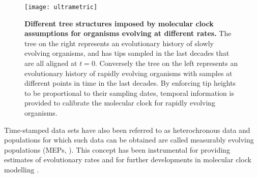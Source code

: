 


\begin{figure}[H]
\centering
\texttt{[image: ultrametric]} 
\caption{
{ \footnotesize 
{\bf Different tree structures imposed by molecular clock assumptions for organisms evolving at different rates.} 
The tree on the right represents an evolutionary history of slowly evolving organisms, and has tips sampled in the last decades that are all aligned at $t=0$. 
Conversely the tree on the left represents an evolutionary history of rapidly evolving organisms with samples at different points in time in the last decades. 
By enforcing tip heights to be proportional to their sampling dates, temporal information is provided to calibrate the molecular clock for rapidly evolving organisms.
}%
}
\label{fig:ultrametric}
\end{figure}

Time-stamped data sets have also been referred to as heterochronous data and %
populations for which such data can be obtained are called measurably evolving populations (MEPs, \cite{Drummond2003}).
This concept has been instrumental for providing estimates of evolutionary rates and for further developments in molecular clock modelling \citep{Drummond2006}.

